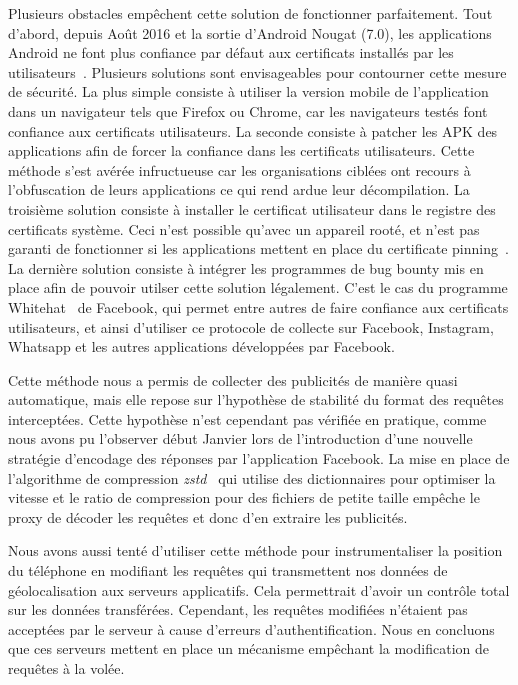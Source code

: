 \documentclass[runningheads]{llncs}
\begin{document}
Plusieurs obstacles empêchent cette solution de fonctionner parfaitement. Tout d'abord, depuis Août 2016 et la sortie d'Android Nougat (7.0), les applications Android ne font plus confiance par défaut aux certificats installés par les utilisateurs~\cite{chad_brubaker_changes_2016}. 
Plusieurs solutions sont envisageables pour contourner cette mesure de sécurité. La plus simple consiste à utiliser la version mobile de l'application dans un navigateur tels que Firefox ou Chrome, car les navigateurs testés font confiance aux certificats utilisateurs. La seconde consiste à patcher les APK des applications afin de forcer la confiance dans les certificats utilisateurs. Cette méthode s'est avérée infructueuse car les organisations ciblées ont recours à l'obfuscation de leurs applications ce qui rend ardue leur décompilation. La troisième solution consiste à installer le certificat utilisateur dans le registre des certificats système. Ceci n'est possible qu'avec un appareil rooté, et n'est pas garanti de fonctionner si les applications mettent en place du certificate pinning~\cite{sleevi_rfc7469_2015}. La dernière solution consiste à intégrer les programmes de bug bounty mis en place afin de pouvoir utilser cette solution légalement. C'est le cas du programme Whitehat~\cite{facebook_whitehat_2020} de Facebook, qui permet entre autres de faire confiance aux certificats utilisateurs, et ainsi d'utiliser ce protocole de collecte sur Facebook, Instagram, Whatsapp et les autres applications développées par Facebook.

Cette méthode nous a permis de collecter des publicités de manière quasi automatique, mais elle repose sur l'hypothèse de stabilité du format des requêtes interceptées. Cette hypothèse n'est cependant pas vérifiée en pratique, comme nous avons pu l'observer début Janvier lors de l'introduction d'une nouvelle stratégie d'encodage des réponses par l'application Facebook. La mise en place de l'algorithme de compression \textit{zstd}~\cite{collet_zstandard_2018} qui utilise des dictionnaires pour optimiser la vitesse et le ratio de compression pour des fichiers de petite taille empêche le proxy de décoder les requêtes et donc d'en extraire les publicités.

Nous avons aussi tenté d'utiliser cette méthode pour instrumentaliser la position du téléphone en modifiant les requêtes qui transmettent nos données de géolocalisation aux serveurs applicatifs. Cela permettrait d'avoir un contrôle total sur les données transférées. Cependant, les requêtes modifiées n'étaient pas acceptées par le serveur à cause d'erreurs d'authentification. Nous en concluons que ces serveurs mettent en place un mécanisme empêchant la modification de requêtes à la volée.
\end{document}
